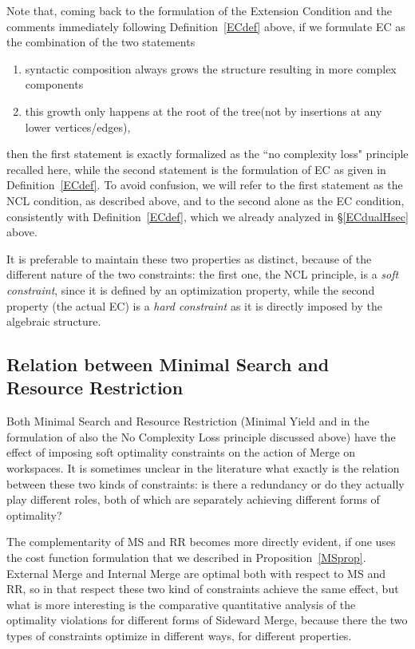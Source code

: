 \documentclass[12pt]{amsart}
\numberwithin{equation}{section}
\begin{document}
\smallskip

Note that, coming back to the formulation of the Extension Condition
and the comments immediately following Definition~\ref{ECdef} above, 
if we formulate EC as the combination of the two statements
\begin{enumerate}
\item  syntactic composition always grows the structure resulting in
more complex components
\item  this growth only happens at the
root of the tree(not by insertions at any lower vertices/edges),
\end{enumerate}
then the first statement is exactly formalized as the 
``no complexity loss" principle recalled here, while
the second statement is the formulation of EC
as given in Definition~\ref{ECdef}. To avoid confusion,
we will refer to the first statement as the NCL condition,
as described above, 
and to the second alone as the EC condition, consistently
with Definition~\ref{ECdef}, which we already
analyzed in \S \ref{ECdualHsec} above. 

It is preferable to maintain these two properties as distinct,
because of the different nature of the two constraints: the 
first one, the NCL principle, is a {\em soft constraint}, since
it is defined by an optimization property, while the second
property (the actual EC) is a {\em hard constraint} as it is 
directly imposed by the algebraic structure. 

\medskip
\subsection{Relation between Minimal Search and Resource Restriction}\label{MSRRrelSec}

Both Minimal Search and Resource Restriction (Minimal Yield and in the
formulation of \cite{MCB} also the No Complexity Loss principle discussed
above) have the effect of imposing soft optimality constraints on the action of Merge
on workspaces. It is sometimes unclear in the literature what exactly is the
relation between these two kinds of constraints: is there a redundancy or do they
actually play different roles, both of which are separately achieving different
forms of optimality?

\smallskip

The complementarity of MS and RR becomes more directly evident, if one
uses the cost function formulation that we described in Proposition~\ref{MSprop}.
External Merge and Internal Merge are optimal both with respect to MS and RR,
so in that respect these two kind of constraints achieve the same effect, but
what is more interesting is the comparative quantitative analysis of the
optimality violations for different forms of Sideward Merge, because there
the two types of constraints optimize in different ways, for different properties.
\end{document}
